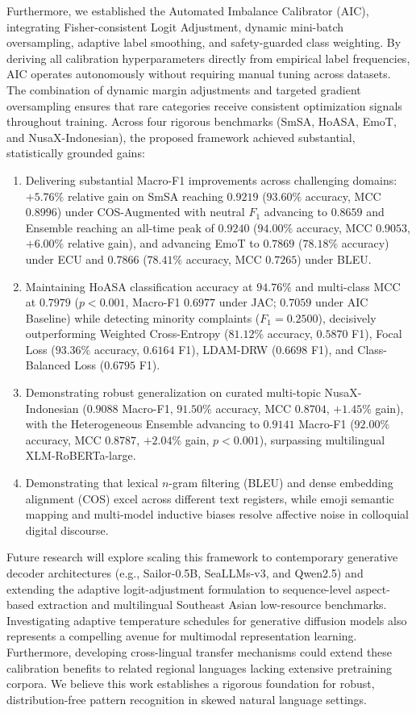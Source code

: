 \documentclass{ieeeaccess}
\begin{document}
Furthermore, we established the Automated Imbalance Calibrator (AIC), integrating Fisher-consistent Logit Adjustment, dynamic mini-batch oversampling, adaptive label smoothing, and safety-guarded class weighting. By deriving all calibration hyperparameters directly from empirical label frequencies, AIC operates autonomously without requiring manual tuning across datasets. The combination of dynamic margin adjustments and targeted gradient oversampling ensures that rare categories receive consistent optimization signals throughout training. Across four rigorous benchmarks (SmSA, HoASA, EmoT, and NusaX-Indonesian), the proposed framework achieved substantial, statistically grounded gains:
\begin{enumerate}
    \item Delivering substantial Macro-F1 improvements across challenging domains: $+5.76\%$ relative gain on SmSA reaching \textbf{$0.9219$} ($93.60\%$ accuracy, MCC $0.8996$) under COS-Augmented with neutral $F_1$ advancing to $0.8659$ and Ensemble reaching an all-time peak of \textbf{$0.9240$} ($94.00\%$ accuracy, MCC $0.9053$, $+6.00\%$ relative gain), and advancing EmoT to \textbf{$0.7869$} ($78.18\%$ accuracy) under ECU and \textbf{$0.7866$} ($78.41\%$ accuracy, MCC $0.7265$) under BLEU.
    \item Maintaining HoASA classification accuracy at \textbf{$94.76\%$} and multi-class MCC at \textbf{$0.7979$} ($p < 0.001$, Macro-F1 $0.6977$ under JAC; $0.7059$ under AIC Baseline) while detecting minority complaints ($F_1 = 0.2500$), decisively outperforming Weighted Cross-Entropy ($81.12\%$ accuracy, $0.5870$ F1), Focal Loss ($93.36\%$ accuracy, $0.6164$ F1), LDAM-DRW ($0.6698$ F1), and Class-Balanced Loss ($0.6795$ F1).
    \item Demonstrating robust generalization on curated multi-topic NusaX-Indonesian ($0.9088$ Macro-F1, $91.50\%$ accuracy, MCC $0.8704$, $+1.45\%$ gain), with the Heterogeneous Ensemble advancing to \textbf{$0.9141$} Macro-F1 ($92.00\%$ accuracy, MCC $0.8787$, $+2.04\%$ gain, $p < 0.001$), surpassing multilingual XLM-RoBERTa-large.
    \item Demonstrating that lexical $n$-gram filtering (BLEU) and dense embedding alignment (COS) excel across different text registers, while emoji semantic mapping and multi-model inductive biases resolve affective noise in colloquial digital discourse.
\end{enumerate}

Future research will explore scaling this framework to contemporary generative decoder architectures (e.g., Sailor-0.5B, SeaLLMs-v3, and Qwen2.5) and extending the adaptive logit-adjustment formulation to sequence-level aspect-based extraction and multilingual Southeast Asian low-resource benchmarks. Investigating adaptive temperature schedules for generative diffusion models also represents a compelling avenue for multimodal representation learning. Furthermore, developing cross-lingual transfer mechanisms could extend these calibration benefits to related regional languages lacking extensive pretraining corpora. We believe this work establishes a rigorous foundation for robust, distribution-free pattern recognition in skewed natural language settings.
\end{document}
